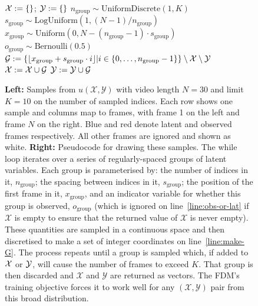 \begin{figure}
\begin{minipage}[t]{0.65\textwidth}
\begin{algorithm}[H]
\begin{algorithmic}[1]
      \State $\mathcal{X} := \{\}$; $\mathcal{Y} := \{\}$
        \State $n_\text{group} \sim \text{UniformDiscrete}(1, K)$ %
        \State $s_\text{group} \sim \text{LogUniform}(1, (N-1)/n_\text{group})$ %
        \State $x_\text{group} \sim \text{Uniform}(0, N-(n_\text{group}-1)\cdot s_\text{group})$ %
        \State $o_\text{group} \sim \text{Bernoulli}(0.5)$
        \State $\mathcal{G} := \{\lfloor x_\text{group} + s_\text{group} \cdot i \rfloor | i \in \{0,\ldots,n_\text{group}-1\} \} \setminus \mathcal{X} \setminus \mathcal{Y}$ \label{line:make-G}
            \State {}
         \label{line:obs-or-lat}
            \State $\mathcal{X} := \mathcal{X} \cup \mathcal{G}$
        \Else
            \State $\mathcal{Y} := \mathcal{Y} \cup \mathcal{G}$
        \EndIf
    \EndWhile
    \end{algorithmic}
\end{algorithm}
\end{minipage}
\caption{\textbf{Left:} Samples from $u(\mathcal{X},\mathcal{Y})$ with video length $N=30$ and limit $K=10$ on the number of sampled indices. Each row shows one sample and columns map to frames, with frame 1 on the left and frame $N$ on the right. Blue and red denote latent and observed frames respectively. All other frames are ignored and shown as white. \textbf{Right:} Pseudocode for drawing these samples. The while loop iterates over a series of regularly-spaced groups of latent variables. Each group is parameterised by: the number of indices in it, $n_\text{group}$; the spacing between indices in it, $s_\text{group}$; the position of the first frame in it, $x_\text{group}$, and an indicator variable for whether this group is observed, $o_\text{group}$ (which is ignored on line~\ref{line:obs-or-lat} if $\mathcal{X}$ is empty to ensure that the returned value of $\mathcal{X}$ is never empty). These quantities are sampled in a continuous space and then discretised to make a set of integer coordinates on line~\ref{line:make-G}. The process repeats until a group is sampled which, if added to $\mathcal{X}$ or $\mathcal{Y}$, will cause the number of frames to exceed $K$. That group is then discarded and $\mathcal{X}$ and $\mathcal{Y}$ are returned as vectors. The FDM's training objective forces it to work well for any $(\mathcal{X},\mathcal{Y})$ pair from this broad distribution.
}
\label{fig:training-distribution}
\end{figure}

